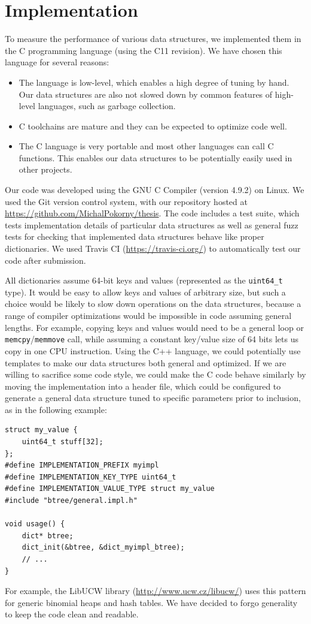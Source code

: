 \chapter{Implementation}
To measure the performance of various data structures, we implemented them
in the C programming language (using the C11 revision).
We have chosen this language for several reasons:
\begin{itemize}
\item The language is low-level, which enables a high degree of tuning by hand.
	Our data structures are also not slowed down by common features of
	high-level languages, such as garbage collection.
\item C toolchains are mature and they can be expected to optimize code well.
\item The C language is very portable and most other languages can
	call C functions. This enables our data structures to be potentially
	easily used in other projects.
\end{itemize}

Our code was developed using the GNU C Compiler (version 4.9.2) on Linux.
We used the Git version control system, with our repository hosted at
\url{https://github.com/MichalPokorny/thesis}. The code includes a test suite,
which tests implementation details of particular data structures as well
as general fuzz tests for checking that implemented data structures behave
like proper dictionaries. We used Travis CI (\url{https://travis-ci.org/})
to automatically test our code after submission.

All dictionaries assume 64-bit keys and values (represented as the
\texttt{uint64\_t} type). It would be easy to allow keys and values of arbitrary
size, but such a choice would be likely to slow down operations on
the data structures, because a range of compiler optimizations would
be impossible in code assuming general lengths. For example, copying
keys and values would need to be a general loop or
\texttt{memcpy}/\texttt{memmove} call, while assuming a constant key/value
size of 64 bits lets us copy in one CPU instruction. Using the C++ language,
we could potentially use templates to make our data structures both general
and optimized. If we are willing to sacrifice some code style, we could
make the C code behave similarly by moving the implementation into a header
file, which could be configured to generate a general data structure
tuned to specific parameters prior to inclusion, as in the following example:
\begin{lstlisting}
struct my_value {
	uint64_t stuff[32];
};
#define IMPLEMENTATION_PREFIX myimpl
#define IMPLEMENTATION_KEY_TYPE uint64_t
#define IMPLEMENTATION_VALUE_TYPE struct my_value
#include "btree/general.impl.h"

void usage() {
	dict* btree;
	dict_init(&btree, &dict_myimpl_btree);
	// ...
}
\end{lstlisting}
For example, the LibUCW library (\url{http://www.ucw.cz/libucw/})
uses this pattern for generic binomial heaps and hash tables.
We have decided to forgo generality to keep the code clean and readable.

